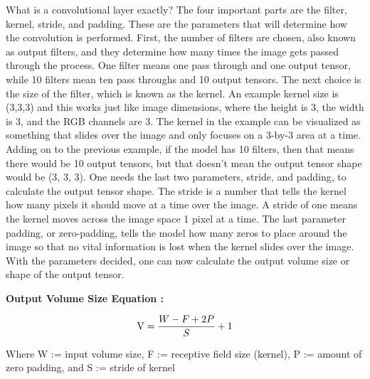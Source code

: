 \documentclass[12pt]{article}
\begin{document}
                What is a convolutional layer exactly? The four important parts are the filter, kernel, stride, and padding. 
                These are the parameters that will determine how the convolution is performed. 
                First, the number of filters are chosen, also known as output filters, 
                and they determine how many times the image gets passed through the process. 
                One filter means one pass through and one output tensor, while 10 filters mean ten pass throughs and 10 output tensors. 
                The next choice is the size of the filter, which is known as the kernel. 
                An example kernel size is (3,3,3) and this works just like image dimensions, 
                where the height is 3, the width is 3, and the RGB channels are 3. 
                The kernel in the example can be visualized as something that slides over the image 
                and only focuses on a 3-by-3 area at a time. Adding on to the previous example, if the model has 10 filters, 
                then that means there would be 10 output tensors, but that doesn’t mean the output tensor shape would be (3, 3, 3). 
                One needs the last two parameters, stride, and padding, to calculate the output tensor shape. 
                The stride is a number that tells the kernel how many pixels it should move at a time over the image. 
                A stride of one means the kernel moves across the image space 1 pixel at a time. 
                The last parameter padding, or zero-padding, tells the model how many zeros to place around the image 
                so that no vital information is lost when the kernel slides over the image. With the parameters decided, 
                one can now calculate the output volume size or shape of the output tensor.
                
                \textbf{Output Volume Size Equation \cite{cs231n2023}:}
                
                \begin{large}
                    
                    \[ \textnormal{V} = \frac{W - F + 2P}{S} + 1    \]

                \end{large}

                \noindent Where W := input volume size, F := receptive field size (kernel), P := amount of zero padding, 
                and S := stride of kernel
\end{document}

